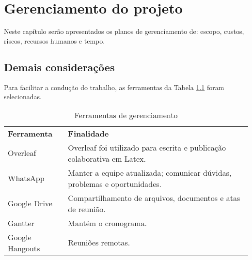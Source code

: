\chapter{Gerenciamento do projeto}

Neste capítulo serão apresentados os planos de gerenciamento de: escopo, custos, riscos, recursos humanos e tempo.



\section{Demais considerações}

Para facilitar a condução do trabalho, as ferramentas da Tabela \ref{tab:ferramentas} foram selecionadas.

\begin{table}[h]
\caption{Ferramentas de gerenciamento} \label{tab:ferramentas}
\centering
 {\renewcommand\arraystretch{1.25}
 \begin{tabular}{ l l }
  \cline{1-1}\cline{2-2}  
    \multicolumn{1}{|p{3.417cm}|}{\textbf{Ferramenta} \centering } &
    \multicolumn{1}{p{8.633cm}|}{\textbf{Finalidade} \centering }
  \\  
  \cline{1-1}\cline{2-2}  
    \multicolumn{1}{|p{3.417cm}|}{Overleaf} &
    \multicolumn{1}{p{8.633cm}|}{Overleaf foi utilizado para escrita e publicação colaborativa em Latex.}
  \\  
  \cline{1-1}\cline{2-2}  
    \multicolumn{1}{|p{3.417cm}|}{WhatsApp} &
    \multicolumn{1}{p{8.633cm}|}{Manter a equipe atualizada; comunicar dúvidas, problemas e oportunidades.}
  \\  
  \cline{1-1}\cline{2-2}  
    \multicolumn{1}{|p{3.417cm}|}{Google Drive} &
    \multicolumn{1}{p{8.633cm}|}{Compartilhamento de arquivos, documentos e atas de reunião.}
  \\  
  \cline{1-1}\cline{2-2}  
    \multicolumn{1}{|p{3.417cm}|}{Gantter} &
    \multicolumn{1}{p{8.633cm}|}{Mantém o cronograma.}
  \\  
  \cline{1-1}\cline{2-2}  
    \multicolumn{1}{|p{3.417cm}|}{Google Hangouts} &
    \multicolumn{1}{p{8.633cm}|}{Reuniões remotas. }
  \\  
  \hline

 \end{tabular} }
\end{table}


